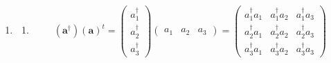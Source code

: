 \documentclass[aps,preprint]{revtex4}
\begin{document}
\begin{enumerate}
\begin{enumerate}
\item 
\begin{enumerate}
\item 
\begin{equation}
\left( \mathbf{a}^{\dagger }\right) \left( \mathbf{a}\right) ^{t}=\left( 
\begin{array}{c}
a_{1}^{\dagger } \\ 
a_{2}^{\dagger } \\ 
a_{3}^{\dagger }%
\end{array}%
\right) \left( 
\begin{array}{ccc}
a_{1} & a_{2} & a_{3}%
\end{array}%
\right) =\left( 
\begin{array}{ccc}
a_{1}^{\dagger }a_{1} & a_{1}^{\dagger }a_{2} & a_{1}^{\dagger }a_{3} \\ 
a_{2}^{\dagger }a_{1} & a_{2}^{\dagger }a_{2} & a_{2}^{\dagger }a_{3} \\ 
a_{3}^{\dagger }a_{1} & a_{3}^{\dagger }a_{2} & a_{3}^{\dagger }a_{3}%
\end{array}%
\right)
\end{equation}


\end{enumerate}
\end{enumerate}
\end{enumerate}
\end{document}
